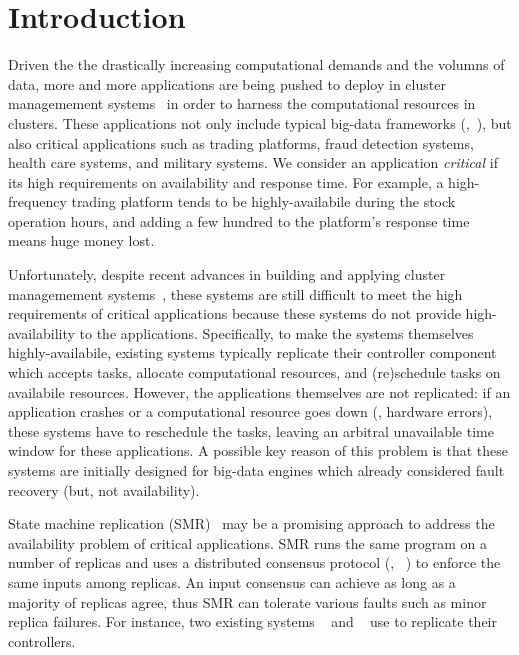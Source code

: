 \section{Introduction} \label{sec:intro}

Driven the the drastically increasing computational demands and the volumns of 
data, more and more applications are being pushed to deploy in cluster 
managemement systems~\cite{mesos,borg,helix,yarn} in order to harness the 
computational resources in clusters. These applications not only include typical 
big-data frameworks (\eg,~\cite{spark}), but also critical applications such as 
trading platforms, fraud detection systems, health care systems, and military 
systems. We consider an application \emph{critical} if its high requirements on 
availability and response time. For example, a high-frequency trading platform 
tends to be highly-availabile during the stock operation hours, and adding a 
few hundred \us to the platform's response time means huge money lost.

Unfortunately, despite recent advances in building and applying cluster 
managemement systems~\cite{mesos,borg,helix,yarn}, these systems are still 
difficult to meet the high requirements of critical applications because these 
systems do not provide high-availability to the applications. Specifically, to 
make the systems themselves highly-availabile, existing systems typically 
replicate their controller component which accepts tasks, allocate 
computational resources, and (re)schedule tasks on availabile resources. 
However, the applications themselves are not replicated: if an application 
crashes or a computational resource goes down (\eg, hardware errors), these 
systems have to reschedule the tasks, leaving an arbitral unavailable time 
window for these applications. A possible key reason of this problem is that 
these systems are initially designed for big-data engines which already 
considered fault recovery (but, not availability).

State machine replication (SMR)~\cite{paxos} may be a promising approach 
to address the availability problem of critical applications. SMR runs the 
same program on a number of replicas and uses a distributed consensus protocol 
(\eg, 
\paxos~\cite{paxos:practical,paxos,paxos:simple,paxos:complex,epaxos:sosp13}) 
to enforce the same inputs among 
replicas. An input consensus can achieve as long as a majority of replicas 
agree, thus SMR can tolerate various faults such as minor replica failures. For 
instance, two existing systems \borg~\cite{borg} and \mesos~\cite{borg} use 
\paxos to replicate their controllers.

